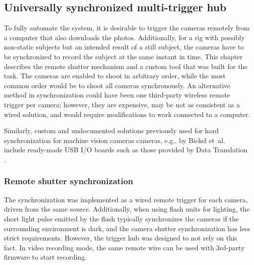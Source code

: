 
\subsection{Universally synchronized multi-trigger hub} %

To fully automate the system, it is desirable to trigger the cameras remotely from a computer that also downloads the photos.
Additionally, for a rig with possibly non-static subjects but an intended result of a still subject, the cameras have to be synchronized to record the subject at the same instant in time.
This chapter describes the remote shutter mechanism and a custom tool that was built for the task.
The cameras are enabled to shoot in arbitrary order, while the most common order would be to shoot all cameras synchronously.
An alternative method in synchronization could have been one third-party wireless remote trigger per camera;
however, they are expensive, may be not as consistent as a wired solution, and would require modifications to work connected to a computer.

Similarly, custom and undocumented solutions previously used for hard synchronization for machine vision cameras cameras, e.g., by Bickel et~al.\ \cite{bickel2007multi} include ready-made USB I/O boards such as those provided by Data Translation \cite{datatranslation}.

\subsubsection{Remote shutter synchronization} %

The synchronization was implemented as a wired remote trigger for each camera, driven from the same source.
Additionally, when using flash units for lighting, the short light pulse emitted by the flash typically synchronizes the cameras if the surrounding environment is dark, and the camera shutter synchronization has less strict requirements.
However, the trigger hub was designed to not rely on this fact.
In video recording mode, the same remote wire can be used with 3rd-party firmware to start recording.

